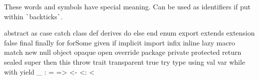 \documentclass[article, a5paper]{memoir}
\newcommand{\LangColor}{scalared}
\newcommand{\mc}[1]{\multicolumn{2}{l}{\hspace{-0.65em}\parbox[t]{102mm}{\small #1}}}
\newcommand{\ind}{\hspace*{1.5em}}
\newcommand{\head}[1]{{\bfseries {\color{\LangColor}{#1}}\par\vspace{1mm}\hrule\vspace{-2mm}}}
\newcommand{\Newline}{\vspace{\baselineskip}}
\newcommand{\LangTitle}[1]{{\centering \Huge{\bfseries\sffamily \color{\LangColor}{#1}}\par}}
\newcommand{\LangRect}[5]{\tikz[overlay, remember picture,inner sep=7pt,minimum height=0.65cm] \node[fill=#2,text=white,rotate=90] at #4 (name) {\large\normalfont\textbf{#1} ~~{\small \thepage(#5)}}; }
\newcommand{\LangRectOdd}[4]{\LangRect{#1}{#2}{#3}{($(current page.north east)-(0.35,#3)$)}{#4}}
\newcommand{\LangRectEven}[4]{\LangRect{#1}{#2}{#3}{($(current page.north west)-(-0.35,#3)$)}{#4}}
\newcommand{\LangMarker}[3]{%
\fancyfoot{} %
\fancyhead{
\ifodd\thepage\LangRectOdd{#1}{\LangColor}{#2}{#3}
\else\LangRectEven{#1}{\LangColor}{#2}{#3}
\fi
}
\renewcommand{\headrulewidth}{0pt}
\renewcommand{\footrulewidth}{0pt}
\pagestyle{fancy}
}
\begin{document}






\Newline\vspace*{1.0em}\head{Reserved words in Scala}\Newline
{\small These words and symbols have special meaning. Can be used as identifiers if put within \verb|`|backticks\verb|`|.}
\vspace*{-0.5em}
\begin{Code}[morekeywords={macro,\_},otherkeywords={>,<-,\%,<,>:,@,:,=,\#},basicstyle=\ttfamily\fontsize{8}{9}\selectfont]
abstract as case catch class def derives do else end enum export extends extension false 
final finally for forSome given if implicit import infix inline lazy macro match new null 
object opaque open override package private protected return sealed super then this throw 
trait transparent true try type using val var while with yield
 _   :   =   =>   <-   <:   <%
\end{Code}



\clearpage
\end{document}
